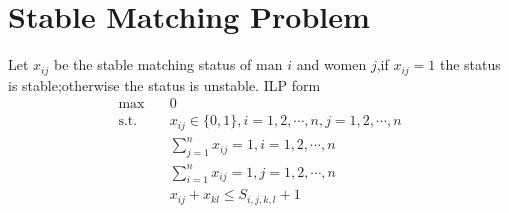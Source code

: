 \section{Stable Matching Problem}
Let $x_{ij}$ be the stable matching status of man $i$ and women $j$,if $x_{ij} = 1$ the status is stable;otherwise the status is unstable.
ILP form 
\[
	\begin{split}
		\max &\quad 0 \\
		\text{s.t.} &\quad x_{ij} \in\{0,1\} , i = 1,2,\cdots, n, j = 1,2,\cdots, n \\
		&\quad \sum_{j=1}^{n} x_{ij} = 1 , i = 1,2,\cdots, n \\
		&\quad \sum_{i=1}^{n} x_{ij} = 1, j = 1,2,\cdots, n \\
		&\quad x_{ij} + x_{kl} \leq S_{i,j,k,l} + 1
	\end{split} 
\]